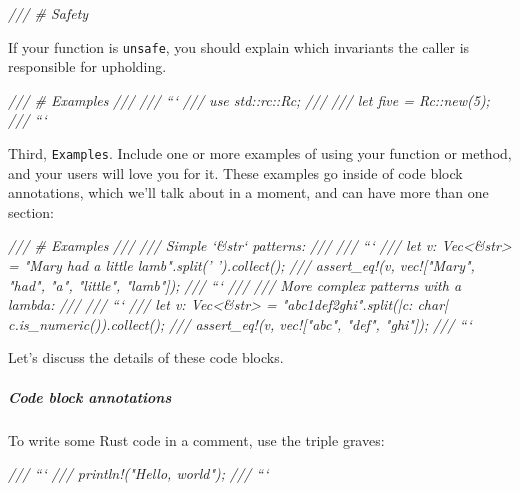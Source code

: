 \documentclass[a4paper,]{book}
\newenvironment{Shaded}{\begin{snugshade}}{\end{snugshade}}
\newcommand{\CommentTok}[1]{\textcolor[rgb]{0.56,0.35,0.01}{\textit{{#1}}}}
\begin{document}
\begin{Shaded}
\begin{Highlighting}[]
\CommentTok{/// # Safety}
\end{Highlighting}
\end{Shaded}

If your function is \texttt{unsafe}, you should explain which invariants
the caller is responsible for upholding.

\begin{Shaded}
\begin{Highlighting}[]
\CommentTok{/// # Examples}
\CommentTok{///}
\CommentTok{/// ```}
\CommentTok{/// use std::rc::Rc;}
\CommentTok{///}
\CommentTok{/// let five = Rc::new(5);}
\CommentTok{/// ```}
\end{Highlighting}
\end{Shaded}

Third, \texttt{Examples}. Include one or more examples of using your
function or method, and your users will love you for it. These examples
go inside of code block annotations, which we'll talk about in a moment,
and can have more than one section:

\begin{Shaded}
\begin{Highlighting}[]
\CommentTok{/// # Examples}
\CommentTok{///}
\CommentTok{/// Simple `&str` patterns:}
\CommentTok{///}
\CommentTok{/// ```}
\CommentTok{/// let v: Vec<&str> = "Mary had a little lamb".split(' ').collect();}
\CommentTok{/// assert_eq!(v, vec!["Mary", "had", "a", "little", "lamb"]);}
\CommentTok{/// ```}
\CommentTok{///}
\CommentTok{/// More complex patterns with a lambda:}
\CommentTok{///}
\CommentTok{/// ```}
\CommentTok{/// let v: Vec<&str> = "abc1def2ghi".split(|c: char| c.is_numeric()).collect();}
\CommentTok{/// assert_eq!(v, vec!["abc", "def", "ghi"]);}
\CommentTok{/// ```}
\end{Highlighting}
\end{Shaded}

Let's discuss the details of these code blocks.

\subparagraph{Code block annotations}\label{code-block-annotations}

To write some Rust code in a comment, use the triple graves:

\begin{Shaded}
\begin{Highlighting}[]
\CommentTok{/// ```}
\CommentTok{/// println!("Hello, world");}
\CommentTok{/// ```}
\end{Highlighting}
\end{Shaded}
\end{document}
